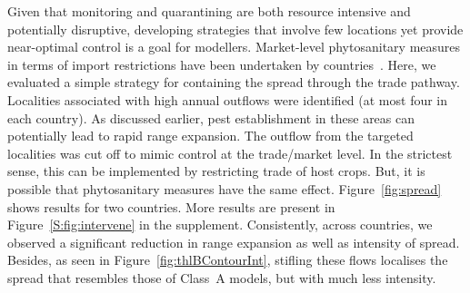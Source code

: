 \documentclass[11pt]{article}
\theoremstyle{definition}
\begin{document}
Given that monitoring and quarantining are both resource intensive and
potentially disruptive, developing strategies that involve few locations
yet provide near-optimal control is a goal for modellers.  Market-level
phytosanitary measures in terms of import restrictions have been undertaken
by countries~\cite{USDA2012}. Here, we evaluated a simple strategy for
containing the spread through the trade pathway. Localities associated with
high annual outflows were identified (at most four in each country). As
discussed earlier, pest establishment in these areas can potentially lead
to rapid range expansion. The outflow from the targeted localities was cut
off to mimic control at the trade/market level. In the strictest sense,
this can be implemented by restricting trade of host crops. But, it is
possible that phytosanitary measures have the same effect.
Figure~\ref{fig:spread} shows results for two countries.  More results are
present in Figure~\ref{S:fig:intervene} in the supplement.  Consistently,
across countries, we observed a significant reduction in range expansion as
well as intensity of spread.  Besides, as seen in
Figure~\ref{fig:thlBContourInt}, stifling these flows localises the spread
that resembles those of Class~A models, but with much less intensity.
\end{document}
